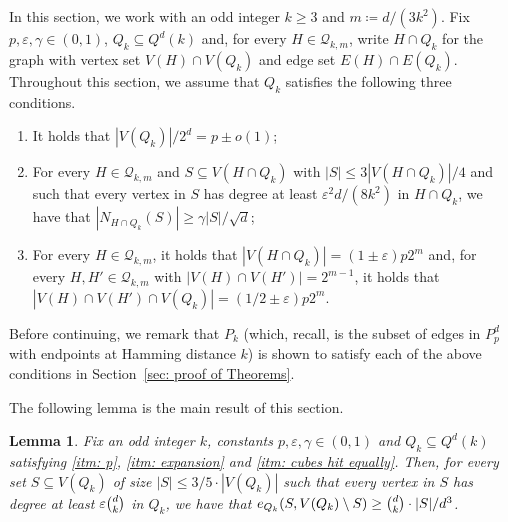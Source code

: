 \documentclass{article}
\newtheorem{lemma}[thm]{Lemma}
\theoremstyle{definition}
\newcommand{\cQ}{\mathcal{Q}}
\begin{document}
In this section, we work with an odd integer $k\ge 3$ and $m\coloneqq  d/(3k^2)$. 
Fix $p,\varepsilon,\gamma\in(0,1)$, $Q_k\subseteq Q^d(k)$ and, for every $H\in \cQ_{k,m}$, write $H\cap  Q_k$ for the graph with vertex set $V(H)\cap V(Q_k)$ and edge set $E(H)\cap E(Q_k)$.
Throughout this section, we assume that $Q_k$ satisfies the following three conditions.
\begin{enumerate}[label=(\roman*), ref=(\roman*)]
    \item\label{itm: p} It holds that $|V(Q_k)|/2^d=p\pm o(1)$; 
    \item\label{itm: expansion} For every $H\in\cQ_{k,m}$ 
    and $S\subseteq V(H\cap  Q_k)$ with $|S|\leq 3|V(H\cap  Q_k)|/4$ and such that every vertex in $S$ has degree at least $\varepsilon^2d/(8k^2)$ in $H\cap  Q_k$, we have that $|N_{H\cap  Q_k}(S)|\ge \gamma|S|/\sqrt d$;
    \item\label{itm: cubes hit equally} For every $H\in\cQ_{k,m}$, it holds that $|V(H\cap Q_k)|= (1\pm \varepsilon)p2^m$ and, for every $H,H'\in\cQ_{k,m}$ with $|V(H)\cap V(H')|=2^{m-1}$, it holds that $|V(H)\cap V(H')\cap V(Q_k)|= (1/2\pm\varepsilon)p2^{m}$.
\end{enumerate}
Before continuing, we remark that $P_k$ (which, recall, is the subset of edges in $P^d_p$ with endpoints at Hamming distance $k$)
is shown to satisfy each of the above conditions in Section~\ref{sec: proof of Theorems}.

The following lemma is the main result of this section.

\begin{lemma}\label{lem: bootstrapped expansion}
Fix an odd integer $k$, constants $p,\varepsilon,\gamma\in(0,1)$ and $Q_k\subseteq Q^d(k)$ satisfying \emph{\ref{itm: p}}, \emph{\ref{itm: expansion}} and \emph{\ref{itm: cubes hit equally}}. Then, for every set $S\subseteq V(Q_k)$ of size $|S|\leq 3/5\cdot|V(Q_k)|$ such that every vertex in $S$ has degree at least $\varepsilon \tbinom{d}{k}$ in $Q_k$, we have that $e_{Q_k}(S,V(Q_k)\setminus S)\geq \tbinom{d}{k}\cdot|S|/d^3$.
\end{lemma}

\end{document}
